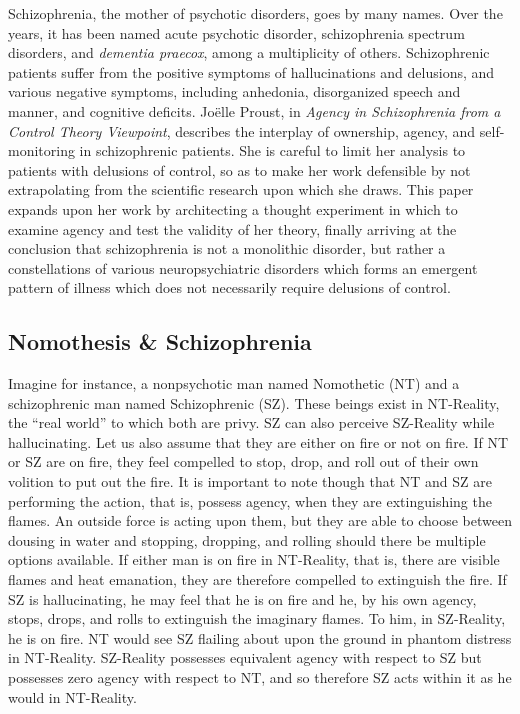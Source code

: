 \documentclass[]{article}
\begin{document}
	Schizophrenia, the mother of psychotic disorders, goes by many names. Over the years, it has been named acute psychotic disorder, schizophrenia spectrum disorders, and \textit{dementia praecox}, among a multiplicity of others. Schizophrenic patients suffer from the positive symptoms of hallucinations and delusions, and various negative symptoms, including anhedonia, disorganized speech and manner, and cognitive deficits. Joëlle Proust, in \textit{Agency in Schizophrenia from a Control Theory Viewpoint}, describes the interplay of ownership, agency, and self-monitoring in schizophrenic patients. She is careful to limit her analysis to patients with delusions of control, so as to make her work defensible by not extrapolating from the scientific research upon which she draws. This paper expands upon her work by architecting a thought experiment in which to examine agency and test the validity of her theory, finally arriving at the conclusion that schizophrenia is not a monolithic disorder, but rather a constellations of various neuropsychiatric disorders which forms an emergent pattern of illness which does not necessarily require delusions of control.
	
	\subsection{Nomothesis \& Schizophrenia}
		
		Imagine for instance, a nonpsychotic man named Nomothetic (NT) and a schizophrenic man named Schizophrenic (SZ). These beings exist in NT-Reality, the “real world” to which both are privy.  SZ can also perceive SZ-Reality while hallucinating. Let us also assume that they are either on fire or not on fire. If NT or SZ are on fire, they feel compelled to stop, drop, and roll out of their own volition to put out the fire. It is important to note though that NT and SZ are performing the action, that is, possess agency, when they are extinguishing the flames. An outside force is acting upon them, but they are able to choose between dousing in water and stopping, dropping, and rolling should there be multiple options available. If either man is on fire in NT-Reality, that is, there are visible flames and heat emanation, they are therefore compelled to extinguish the fire. If SZ is hallucinating, he may feel that he is on fire and he, by his own agency, stops, drops, and rolls to extinguish the imaginary flames. To him, in SZ-Reality, he is on fire. NT would see SZ flailing about upon the ground in phantom distress in NT-Reality. SZ-Reality possesses equivalent agency with respect to SZ but possesses zero agency with respect to NT, and so therefore SZ acts within it as he would in NT-Reality.
		
\end{document}
